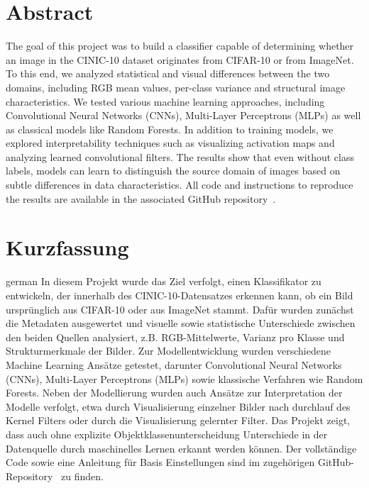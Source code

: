 \thispagestyle{plain}

\section*{Abstract}
The goal of this project was to build a classifier capable of determining whether an image in the CINIC-10 dataset originates from CIFAR-10 or from ImageNet. 
To this end, we analyzed statistical and visual differences between the two domains, including RGB mean values, per-class variance and structural image characteristics.
We tested various machine learning approaches, including Convolutional Neural Networks (CNNs), Multi-Layer Perceptrons (MLPs) as well as classical models like Random Forests. 
In addition to training models, we explored interpretability techniques such as visualizing activation maps and analyzing learned convolutional filters. 
The results show that even without class labels, models can learn to distinguish the source domain of images based on subtle differences in data characteristics.
All code and instructions to reproduce the results are available in the associated GitHub repository~\cite{cinic10-source-classifier}.

\section*{Kurzfassung}
\begin{foreignlanguage}{german}
In diesem Projekt wurde das Ziel verfolgt, einen Klassifikator zu entwickeln, der innerhalb des CINIC-10-Datensatzes erkennen kann, ob ein Bild ursprünglich aus CIFAR-10 oder aus ImageNet 
stammt. Dafür wurden zunächst die Metadaten ausgewertet und visuelle sowie statistische Unterschiede zwischen den beiden Quellen analysiert, z.B. RGB-Mittelwerte, 
Varianz pro Klasse und Strukturmerkmale der Bilder.
Zur Modellentwicklung wurden verschiedene Machine Learning Ansätze getestet, darunter Convolutional Neural Networks (CNNs), Multi-Layer Perceptrons (MLPs) sowie klassische Verfahren wie 
Random Forests.
Neben der Modellierung wurden auch Ansätze zur Interpretation der Modelle verfolgt, etwa durch Visualisierung einzelner Bilder nach durchlauf des Kernel Filters oder 
durch die Visualisierung gelernter Filter. 
Das Projekt zeigt, dass auch ohne explizite Objektklassenunterscheidung Unterschiede in der Datenquelle durch maschinelles Lernen erkannt werden können.
Der vollständige Code sowie eine Anleitung für Basis Einstellungen sind im zugehörigen GitHub-Repository~\cite{cinic10-source-classifier} zu finden.
\end{foreignlanguage}
